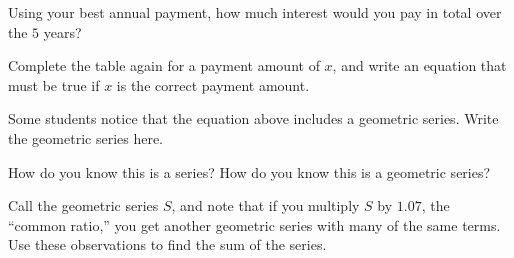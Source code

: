\documentclass[,nooutcomes]{ximera}
\begin{document}
\begin{question}
Using your best annual payment, how much interest would you pay in total over the $5$ years? 
\begin{freeResponse}
\end{freeResponse}
\end{question}

\begin{question}
Complete the table again for a payment amount of $x$, and write an equation that must be true if $x$ is the correct
payment amount.   
\begin{freeResponse}
\end{freeResponse}
\end{question}

\begin{question}
Some students notice that the equation above includes a geometric series.  Write the geometric series here.
\begin{freeResponse}
\end{freeResponse}
\end{question}

\begin{question}
How do you know this is a series?  How do you know this is a geometric series?   
\begin{freeResponse}
\end{freeResponse}
\end{question}

\begin{question}
Call the geometric series $S$, and note that if you multiply $S$ by $1.07$, the ``common ratio,'' you get another geometric series with many of the same terms.  Use these observations to find the sum of the series.   
\begin{freeResponse}
\end{freeResponse}
\end{question}
\end{document}
